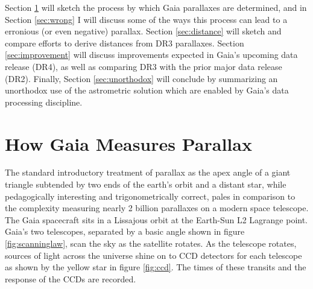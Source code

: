 \documentclass[twocolumn]{aastex631}
\begin{document}
Section \ref{sec:parallax} will sketch the process by which Gaia parallaxes are determined, and in Section \ref{sec:wrong} I will discuss some of the ways this process can lead to a erronious (or even negative) parallax.
Section \ref{sec:distance} will sketch and compare efforts to derive distances from DR3 parallaxes. Section \ref{sec:improvement} will discuss improvements expected in Gaia's upcoming data release (DR4), as well as comparing DR3 with the prior major data release (DR2). Finally, Section \ref{sec:unorthodox} will conclude by summarizing an unorthodox use of the astrometric solution which are enabled by Gaia's data processing discipline.

\section{How Gaia Measures Parallax} \label{sec:parallax}

The standard introductory treatment of parallax as the apex angle of a giant triangle subtended by two ends of the earth's orbit and a distant star, while pedagogically interesting and trigonometrically correct, pales in comparison to the complexity measuring nearly 2 billion parallaxes on a modern space telescope. The Gaia spacecraft sits in a Lissajous orbit at the Earth-Sun L2 Lagrange point. Gaia's two telescopes, separated by a basic angle shown in figure \ref{fig:scanninglaw}, scan the sky as the satellite rotates. As the telescope rotates, sources of light across the universe shine on to CCD detectors for each telescope as shown by the yellow star in figure \ref{fig:ccd}. The times of these transits and the response of the CCDs are recorded.
\end{document}
